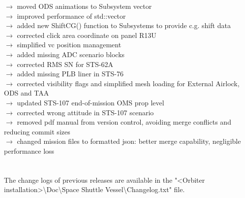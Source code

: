 \documentclass[Space_Shuttle_Vessel_Manual.tex]{subfiles}
\begin{document}
$\rightarrow$ moved ODS animations to Subsystem vector\\
$\rightarrow$ improved performance of std::vector\\
$\rightarrow$ added new ShiftCG() function to Subsystems to provide c.g. shift data\\
$\rightarrow$ corrected click area coordinate on panel R13U\\
$\rightarrow$ simplified vc position management\\
$\rightarrow$ added missing ADC scenario blocks\\
$\rightarrow$ corrected RMS SN for STS-62A\\
$\rightarrow$ added missing PLB liner in STS-76\\
$\rightarrow$ corrected visibility flags and simplified mesh loading for External Airlock, ODS and TAA\\
$\rightarrow$ updated STS-107 end-of-mission OMS prop level\\
$\rightarrow$ corrected wrong attitude in STS-107 scenario\\
$\rightarrow$ removed pdf manual from version control, avoiding merge conflicts and reducing commit sizes\\
$\rightarrow$ changed mission files to formatted json: better merge capability, negligible performance loss\\
\\
\\
The change logs of previous releases are available in the "<Orbiter installation>\textbackslash Doc\textbackslash Space Shuttle Vessel\textbackslash Changelog.txt" file.
\end{document}
